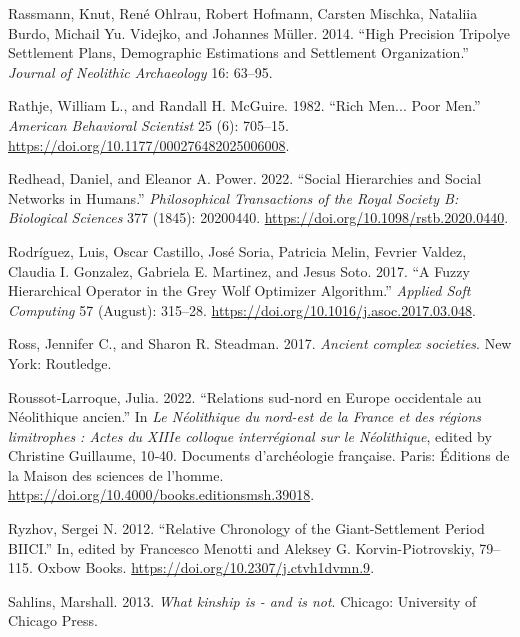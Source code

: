 \documentclass[
  12pt,
  a4paper, twoside]{book}
\newlength{\cslhangindent}
\newlength{\cslentryspacingunit} %
\newenvironment{CSLReferences}[2] %
 {%
  \setlength{\parindent}{0pt}
  \ifodd #1
  \let\oldpar\par
  \def\par{\hangindent=\cslhangindent\oldpar}
  \fi
  \setlength{\parskip}{#2\cslentryspacingunit}
 }%
 {}
\begin{document}
\begin{CSLReferences}{1}{0}
\leavevmode{}%
Rassmann, Knut, René Ohlrau, Robert Hofmann, Carsten Mischka, Nataliia Burdo, Michail Yu. Videjko, and Johannes Müller. 2014. {``High Precision Tripolye Settlement Plans, Demographic Estimations and Settlement Organization.''} \emph{Journal of Neolithic Archaeology} 16: 63--95.

\leavevmode{}%
Rathje, William L., and Randall H. McGuire. 1982. {``Rich Men... Poor Men.''} \emph{American Behavioral Scientist} 25 (6): 705--15. \url{https://doi.org/10.1177/000276482025006008}.

\leavevmode{}%
Redhead, Daniel, and Eleanor A. Power. 2022. {``Social Hierarchies and Social Networks in Humans.''} \emph{Philosophical Transactions of the Royal Society B: Biological Sciences} 377 (1845): 20200440. \url{https://doi.org/10.1098/rstb.2020.0440}.

\leavevmode{}%
Rodríguez, Luis, Oscar Castillo, José Soria, Patricia Melin, Fevrier Valdez, Claudia I. Gonzalez, Gabriela E. Martinez, and Jesus Soto. 2017. {``A Fuzzy Hierarchical Operator in the Grey Wolf Optimizer Algorithm.''} \emph{Applied Soft Computing} 57 (August): 315--28. \url{https://doi.org/10.1016/j.asoc.2017.03.048}.

\leavevmode{}%
Ross, Jennifer C., and Sharon R. Steadman. 2017. \emph{Ancient complex societies}. New York: Routledge.

\leavevmode{}%
Roussot‑Larroque, Julia. 2022. {``Relations sud‑nord en Europe occidentale au Néolithique ancien.''} In \emph{Le Néolithique du nord-est de la France et des régions limitrophes : Actes du XIIIe colloque interrégional sur le Néolithique}, edited by Christine Guillaume, 10‑40. Documents d'archéologie française. {Paris}: {Éditions de la Maison des sciences de l'homme}. \url{https://doi.org/10.4000/books.editionsmsh.39018}.

\leavevmode{}%
Ryzhov, Sergei N. 2012. {``Relative Chronology of the Giant-Settlement Period BII{\textendash}CI.''} In, edited by Francesco Menotti and Aleksey G. Korvin-Piotrovskiy, 79--115. Oxbow Books. \url{https://doi.org/10.2307/j.ctvh1dvmn.9}.

\leavevmode{}%
Sahlins, Marshall. 2013. \emph{What kinship is - and is not}. Chicago: University of Chicago Press.


\end{CSLReferences}
\end{document}
